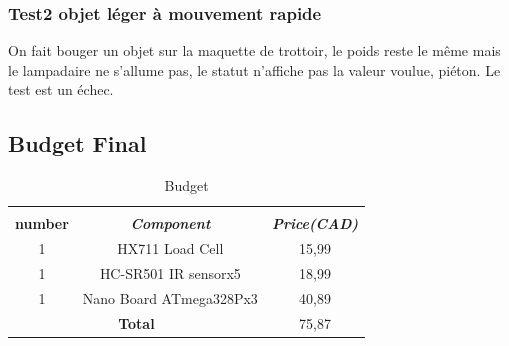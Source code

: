 \documentclass[journal]{IEEEtran}
\begin{document}
\subsubsection{Test2 objet léger à mouvement rapide}
On fait bouger un objet sur la maquette de trottoir, le poids reste le même mais le lampadaire ne s'allume pas, le statut n'affiche pas la valeur voulue, piéton. Le test est un échec.

\subsection{Budget Final}

\begin{table}[htbp]
    \caption{Budget}
    \begin{center}
    \begin{tabular}{|c|c|c|}
    \hline\\
    \textbf{number} & \textbf{\textit{Component}}& \textbf{\textit{Price(CAD)}}\\
    \hline
    1& HX711 Load Cell& 15,99   \\
    \hline
    1&  HC-SR501 IR sensorx5& 18,99\\
    \hline
    1&  Nano Board ATmega328Px3& 40,89\\ 
    \hline
    \multicolumn{2}{|c|}{\textbf{Total}}& 75,87\\
    \end{tabular}
    \label{tab1}
    \end{center}
    \end{table}
    
\end{document}
